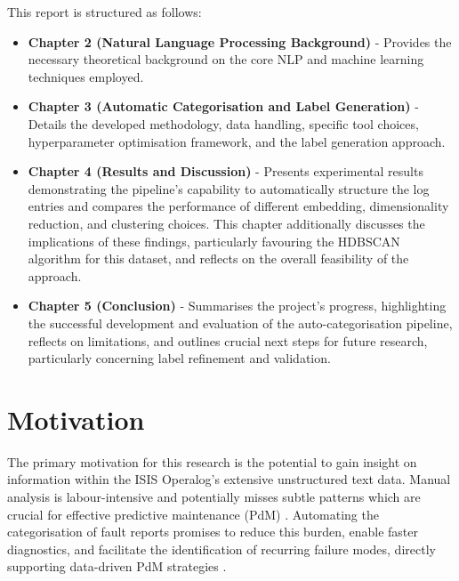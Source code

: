 \documentclass[10pt,oneside]{report}
\begin{document}

This report is structured as follows:

\begin{itemize}
    \item \textbf{Chapter 2 (Natural Language Processing Background)} - Provides the necessary theoretical background on the core NLP and machine learning techniques employed.
    \item \textbf{Chapter 3 (Automatic Categorisation and Label Generation)} - Details the developed methodology, data handling, specific tool choices, hyperparameter optimisation framework, and the label generation approach.
    \item \textbf{Chapter 4 (Results and Discussion)} - Presents experimental results demonstrating the pipeline's capability to automatically structure the log entries and compares the performance of different embedding, dimensionality reduction, and clustering choices. This chapter additionally discusses the implications of these findings, particularly favouring the HDBSCAN algorithm \cite{campello2013density} for this dataset, and reflects on the overall feasibility of the approach.
    \item \textbf{Chapter 5 (Conclusion)} - Summarises the project's progress, highlighting the successful development and evaluation of the auto-categorisation pipeline, reflects on limitations, and outlines crucial next steps for future research, particularly concerning label refinement and validation.
\end{itemize}

\section{Motivation}

The primary motivation for this research is the potential to gain insight on information within the ISIS Operalog's extensive unstructured text data. Manual analysis is labour-intensive and potentially misses subtle patterns which are crucial for effective predictive maintenance (PdM) \cite{usuga2022using, borgi2017data, susto2012predictive, susto2016dealing}. Automating the categorisation of fault reports promises to reduce this burden, enable faster diagnostics, and facilitate the identification of recurring failure modes, directly supporting data-driven PdM strategies \cite{nota2022text, abijith2023large, carvalho2019systematic}.
\end{document}

